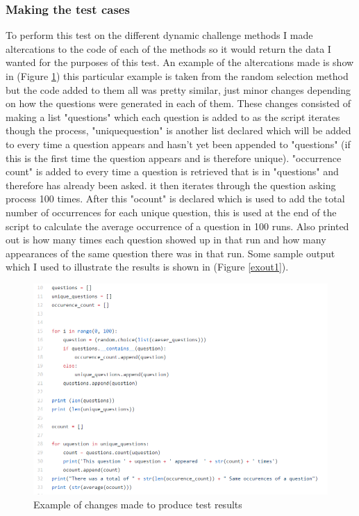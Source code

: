 \documentclass[12pt,a4paper]{article}
\begin{document}
\subsubsection{Making the test cases} 
To perform this test on the different dynamic challenge methods I made altercations to the code of each of the methods so it would return the data I wanted for the purposes of this test. An example of the altercations made is show in (Figure \ref{testcases}) this particular example is taken from the random selection method but the code added to them all was pretty similar, just minor changes depending on how the questions were generated in each of them. These changes consisted of making a list "questions" which each question is added to as the script iterates though the process, "unique\textunderscore question" is another list declared which will be added to every time a question appears and hasn't yet been appended to "questions" (if this is the first time the question appears and is therefore unique). "occurrence \textunderscore count" is added to every time a question is retrieved that is in "questions" and therefore has already been asked. it then iterates through the question asking process 100 times. After this "ocount" is declared which is used to add the total number of occurrences for each unique question, this is used at the end of the script to calculate the average occurrence of a question in 100 runs. Also printed out is how many times each question showed up in that run and how many appearances of the same question there was in that run. Some sample output which I used to illustrate the results is shown in (Figure \ref{exout1}).

\begin{figure}[h]
    \centering
    \includegraphics[width=1.0\textwidth]{Figs/testcases.PNG} 
    \caption{Example of changes made to produce test results} 
    \label{testcases}
\end{figure} 
\end{document}
